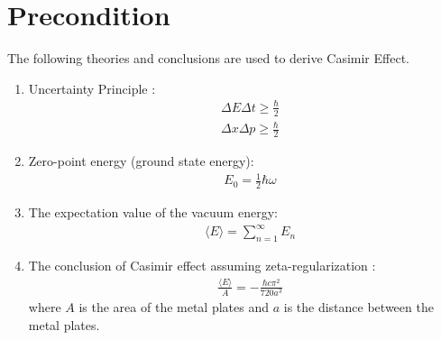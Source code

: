 \section{Precondition}
The following theories and conclusions are used to derive Casimir Effect.
\begin{enumerate}
    \item Uncertainty Principle \cite{heisenberg1930physical}:
        \begin{align}
            &\Delta E \Delta t \ge \frac{\hbar}{2}\\
            &\Delta x \Delta p \ge \frac{\hbar}{2}
        \end{align}
    \item Zero-point energy (ground state energy): \begin{align}&E_0 = \frac{1}{2}\hbar\omega\end{align}
    \item The expectation value of the vacuum energy: \begin{align}&\langle E \rangle = \sum_{n=1}^{\infty} E_n\end{align}
    \item The conclusion of Casimir effect \cite{Casimir:1948dh} assuming zeta-regularization \cite{enwiki:1212199656}: 
    \begin{align}&\frac{\langle E \rangle}{A} = -\frac{\hbar c \pi^2}{720 a^3}\end{align}
    where \(A\) is the area of the metal plates and $a$ is the distance between the metal plates.
\end{enumerate}
